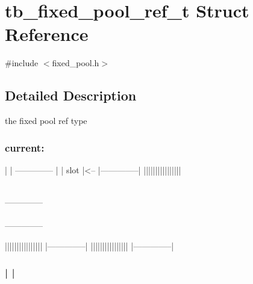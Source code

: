 \hypertarget{structtb__fixed__pool__ref__t}{\section{tb\-\_\-fixed\-\_\-pool\-\_\-ref\-\_\-t Struct Reference}
\label{structtb__fixed__pool__ref__t}
}


{\ttfamily \#include $<$fixed\-\_\-pool.\-h$>$}



\subsection{Detailed Description}
the fixed pool ref type


\begin{DoxyPre}\end{DoxyPre}



\begin{DoxyPre}\subsubsection*{current:
}\end{DoxyPre}



\begin{DoxyPre}
       |           |
 --------------    |
|     slot     |<--
|--------------|
||||||||||||||||  
\begin{TabularC}{1}
\hline
{}\\
--------------
\\
\\
--------------
\\
\end{TabularC}
||||||||||||||||  
|--------------| 
|||||||||||||||| 
|--------------| 
\subsubsection*{|              | 
}\end{DoxyPre}



\begin{DoxyPre}\end{DoxyPre}



